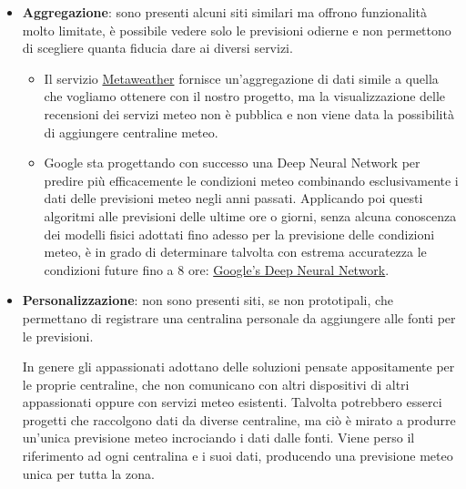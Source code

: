 \begin{itemize}

    \item \textbf{Aggregazione}: sono presenti alcuni siti similari ma offrono funzionalità molto limitate, è possibile vedere solo le previsioni odierne e non permettono di scegliere quanta fiducia dare ai diversi servizi.
    
    \begin{itemize}
    
        \item Il servizio \href{https://www.metaweather.com/it/}{Metaweather} fornisce un'aggregazione di dati simile a quella che vogliamo ottenere con il nostro progetto, ma la visualizzazione delle recensioni dei servizi meteo non è pubblica e non viene data la possibilità di aggiungere centraline meteo.
        
        \item Google sta progettando con successo una Deep Neural Network per predire più efficacemente le condizioni meteo combinando esclusivamente i dati delle previsioni meteo negli anni passati. Applicando poi questi algoritmi alle previsioni delle ultime ore o giorni, senza alcuna conoscenza dei modelli fisici adottati fino adesso per la previsione delle condizioni meteo, è in grado di determinare talvolta con estrema accuratezza le condizioni future fino a 8 ore: \href{https://neurohive.io/en/news/google-s-deep-neural-network-makes-detailed-weather-forecasts/}{Google's Deep Neural Network}. 
        
    \end{itemize}
    
    \item \textbf{Personalizzazione}: non sono presenti siti, se non prototipali, che permettano di registrare una centralina personale da aggiungere alle fonti per le previsioni. 
    
    \par In genere gli appassionati adottano delle soluzioni pensate appositamente per le proprie centraline, che non comunicano con altri dispositivi di altri appassionati oppure con servizi meteo esistenti. Talvolta potrebbero esserci progetti che raccolgono dati da diverse centraline, ma ciò è mirato a produrre un'unica previsione meteo incrociando i dati dalle fonti. Viene perso il riferimento ad ogni centralina e i suoi dati, producendo una previsione meteo unica per tutta la zona.
    
\end{itemize}
 

